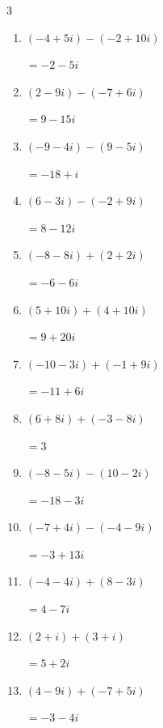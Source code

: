 \begin{multicols}{3}
\begin{enumerate}
        $\displaystyle =1+5i$

\columnbreak %

  \item $\displaystyle (-4+5i) - (-2+10i)$

        $\displaystyle =-2-5i$

  \item $\displaystyle (2-9i) - (-7+6i)$

        $\displaystyle =9-15i$

  \item $\displaystyle (-9-4i) - (9-5i)$

        $\displaystyle =-18+i$

  \item $\displaystyle (6-3i) - (-2+9i)$

        $\displaystyle =8-12i$

  \item $\displaystyle (-8-8i) + (2+2i)$

        $\displaystyle =-6-6i$

  \item $\displaystyle (5+10i) + (4+10i)$

        $\displaystyle =9+20i$

  \item $\displaystyle (-10-3i) + (-1+9i)$

        $\displaystyle =-11+6i$

  \item $\displaystyle (6+8i) + (-3-8i)$

        $\displaystyle =3$

  \item $\displaystyle (-8-5i) - (10-2i)$

        $\displaystyle =-18-3i$

  \item $\displaystyle (-7+4i) - (-4-9i)$

        $\displaystyle =-3+13i$

  \item $\displaystyle (-4-4i) + (8-3i)$

        $\displaystyle =4-7i$

  \item $\displaystyle (2+i) + (3+i)$

        $\displaystyle =5+2i$

  \item $\displaystyle (4-9i) + (-7+5i)$

        $\displaystyle =-3-4i$


\end{enumerate}
\end{multicols}
